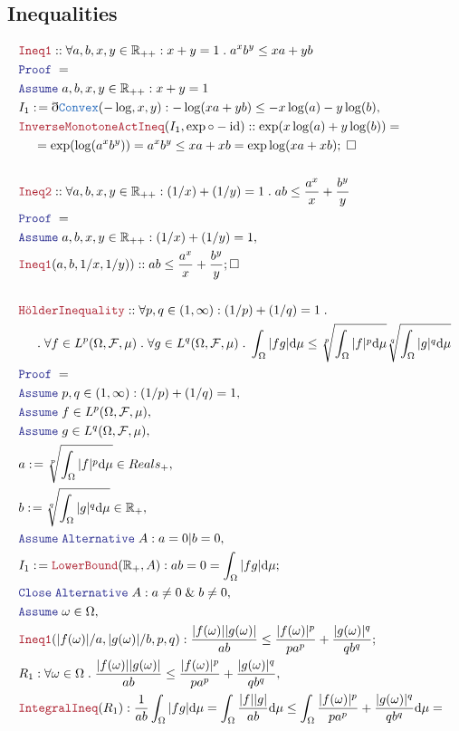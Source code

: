 \documentclass[12pt]{article}
\newcommand{\TYPE}[1]{\textcolor{NavyBlue}{\mathtt{#1}}}
\newcommand{\LOGIC}[1]{\textcolor{Blue}{\mathtt{#1}}}
\newcommand{\THM}[1]{\textcolor{Maroon}{\mathtt{#1}}}
\renewcommand{\.}{\; . \;}
\newcommand{\de}{: \kern 0.1pc =}
\newcommand{\NewLine}{\\ & \kern 1pc}
\newcommand{\Reals}{\mathbb{R} }
\renewcommand{\And}{\; \& \;}
\newcommand{\A}{\LOGIC{Assume} \;}
\newcommand{\QED}{\; \square}
\newcommand{\ByDef}{\eth}
\newcommand{\Alt}{\LOGIC{Alternative} \;}
\newcommand{\CL}{\LOGIC{Close} \;}
\newcommand{\Proof}{\LOGIC{Proof} \; }
\newcommand{\F}{\mathcal{F}}
\renewcommand{\O}{\Omega}
\begin{document}
\subsection{Inequalities}
\begin{align*}
& \THM{Ineq1} :: \forall a,b,x,y \in \Reals_{++} : x + y = 1 \. a^x b^y \le xa + yb  \\
&  \Proof =  \\
&  \A    a,b,x,y \in \Reals_{++} : x + y = 1 \,        \\
&   I_1  \de \ByDef \TYPE{Convex}(-\log,x,y) : -\log(xa + yb) \le -x\log(a) - y\log(b), \\
&   \THM{InverseMonotoneActIneq}(I_1, \exp \circ - \mathrm{id}) :: \exp(x\log(a) + y\log(b)) =
 \NewLine
= \exp(\log(a^xb^y)) = a^xb^y \le xa + xb = \exp \log (xa + xb) ; \QED     
 \\ \\
 & \THM{Ineq2} :: \forall a,b,x,y \in \Reals_{++} : (1/x) + (1/y) = 1 \. a b \le  \frac{a^x}{x} + \frac{b^y}{y}  \\
&  \Proof =  \\
&  \A    a,b,x,y \in \Reals_{++} : (1/x) + (1/y) = 1 ,        \\
&  \THM{Ineq1}(a,b,1/x,1/y)) :: a b \le \frac{a^x}{x} + \frac{b^y}{y} ; \square
\\ \\
& \THM{H\ddot olderInequality} :: \forall p,q \in (1,\infty) : (1/p) + (1/q) = 1 \. 
\NewLine \.
\forall f \in L^p(\O,\F,\mu) \. \forall g \in L^q(\O,\F,\mu) \. \int_\O |fg| \mathrm{d} \mu \le \sqrt[p]{\int_\O |f|^p\mathrm{d}\mu}\sqrt[q]{\int_\O |g|^q\mathrm{d}\mu} \\
& \Proof = \\
&  \A p,q  \in (1,\infty) : (1/p) + (1/q) = 1, \\   
&   \A f \in L^p(\O,\F,\mu), \\
&  \A g \in L^q(\O,\F,\mu),  \\
&   a \de   \sqrt[p]{\int_\O |f|^p\mathrm{d}\mu} \in Reals_+,            \\
&  b \de   \sqrt[q]{\int_\O |g|^q\mathrm{d}\mu} \in \Reals_+, \\
&  \A \Alt A : a = 0|b = 0, \\
&  I_1 \de \THM{LowerBound}(\Reals_+,A) : ab = 0 =  \int_\O |fg| \mathrm{d}\mu; \\
&   \CL \Alt A : a \neq 0 \And b \neq 0, \\
&   \A \omega \in \O,           \\
&   \THM{Ineq1}(|f(\omega)|/a, |g(\omega)|/b,p,q) : \frac{|f(\omega)||g(\omega)|}{ab} \le \frac{|f(\omega)|^p}{pa^p} +     \frac{|g(\omega)|^q}{qb^q};\\
& R_1 : \forall \omega \in \O \.  \frac{|f(\omega)||g(\omega)|}{ab} \le \frac{|f(\omega)|^p}{pa^p} +     \frac{|g(\omega)|^q}{qb^q}, \\
&  \THM{IntegralIneq}(R_1) : \frac{1}{ab}\int_\O |fg|\mathrm{d}\mu  = \int_\O \frac{|f||g|}{ab}\mathrm{d}\mu \le \int_\O \frac{|f(\omega)|^p}{pa^p} +     \frac{|g(\omega)|^q}{qb^q} \mathrm{d}\mu  =
\end{align*}
\end{document}
